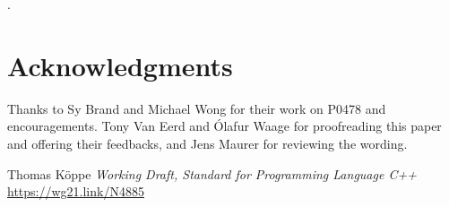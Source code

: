 \documentclass{wg21}
\begin{document}
.


\section{Acknowledgments}

Thanks to Sy Brand and Michael Wong for their work on P0478 and encouragements.
Tony Van Eerd and Ólafur Waage for proofreading this paper and offering their feedbacks, and Jens Maurer for reviewing the wording.






\renewcommand{\section}[2]{}%
\begin{thebibliography}{9}

    Thomas Köppe
    \emph{Working Draft, Standard for Programming Language C++}\newline
    \url{https://wg21.link/N4885}

\end{thebibliography}
\end{document}

